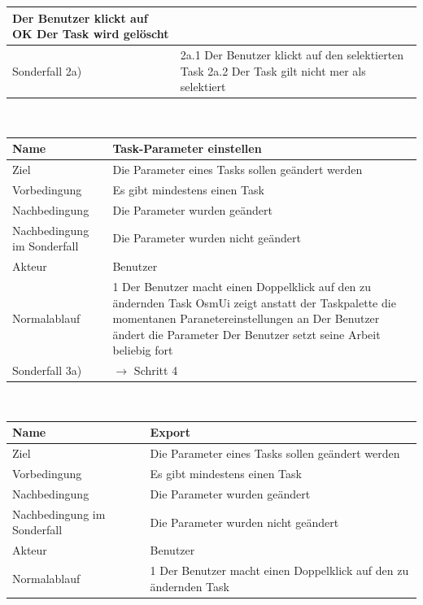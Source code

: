 \documentclass[a4paper,12pt]{scrartcl}
\begin{document}
\begin{center}
\begin{tabular}{|p{5cm}|p{10cm}|}
\newline 4 Der Benutzer klickt auf OK
\newline 5 Der Task wird gelöscht\\ 
\hline Sonderfall 2a) & 2a.1 Der Benutzer klickt auf den selektierten Task
\newline 2a.2 Der Task gilt nicht mer als selektiert\\
\hline 
\end{tabular}  
\vspace{0.7cm}
\\
\begin{tabular}{|p{5cm}|p{10cm}|}
\hline Name & \textbf{Task-Parameter einstellen} \\ 
\hline Ziel & Die Parameter eines Tasks sollen geändert werden\\ 
\hline Vorbedingung & Es gibt mindestens einen Task\\ 
\hline Nachbedingung & Die Parameter wurden geändert \\  
\hline Nachbedingung im Sonderfall & Die Parameter wurden nicht geändert\\
\hline Akteur & Benutzer \\ 
\hline Normalablauf & 1 Der Benutzer macht einen Doppelklick auf den zu ändernden Task
\newline 2 OsmUi zeigt anstatt der Taskpalette die momentanen Paranetereinstellungen an
\newline 3 Der Benutzer ändert die Parameter
\newline 4 Der Benutzer setzt seine Arbeit beliebig fort\\ 
\hline Sonderfall 3a) & $ \rightarrow$ Schritt 4\\
\hline 
\end{tabular} 
\vspace{0.7cm}
\\
\begin{tabular}{|p{5cm}|p{10cm}|}
\hline Name & \textbf{Export} \\ 
\hline Ziel & Die Parameter eines Tasks sollen geändert werden\\ 
\hline Vorbedingung & Es gibt mindestens einen Task\\ 
\hline Nachbedingung & Die Parameter wurden geändert \\  
\hline Nachbedingung im Sonderfall & Die Parameter wurden nicht geändert\\
\hline Akteur & Benutzer \\ 
\hline Normalablauf & 1 Der Benutzer macht einen Doppelklick auf den zu ändernden Task

\end{tabular}
\end{center}
\end{document}
